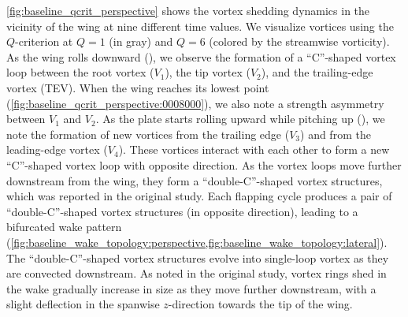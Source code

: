 \cref{fig:baseline_qcrit_perspective} shows the vortex shedding dynamics in the vicinity of the wing at nine different time values.
We visualize vortices using the $Q$-criterion at $Q = 1$ (in gray) and $Q = 6$ (colored by the streamwise vorticity).
As the wing rolls downward (), we observe the formation of a ``C''-shaped vortex loop between the root vortex ($V_1$), the tip vortex ($V_2$), and the trailing-edge vortex (TEV).
When the wing reaches its lowest point (\cref{fig:baseline_qcrit_perspective:0008000}), we also note a strength asymmetry between $V_1$ and $V_2$.
As the plate starts rolling upward while pitching up (), we note the formation of new vortices from the trailing edge ($V_3$) and from the leading-edge vortex ($V_4$).
These vortices interact with each other to form a new ``C''-shaped vortex loop with opposite direction.
As the vortex loops move further downstream from the wing, they form a ``double-C''-shaped vortex structures, which was reported in the original study.
Each flapping cycle produces a pair of ``double-C''-shaped vortex structures (in opposite direction), leading to a bifurcated wake pattern (\cref{fig:baseline_wake_topology:perspective,fig:baseline_wake_topology:lateral}).
The ``double-C''-shaped vortex structures evolve into single-loop vortex as they are convected downstream.
As noted in the original study, vortex rings shed in the wake gradually increase in size as they move further downstream, with a slight deflection in the spanwise $z$-direction towards the tip of the wing.

